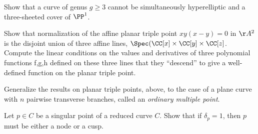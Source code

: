 \begin{exercise}\label{gonality exclusion}
Show that a curve of genus $g \geq 3$ cannot be simultaneously hyperelliptic and a three-sheeted cover of $\PP^1$.
\end{exercise}

\begin{exercise}\label{planar triple pt}
Show that normalization of the affine planar triple point $xy(x-y) = 0$ in $\AA^2$ is the disjoint union of three
affine lines, $\Spec(\CC[x] \times \CC[y]\times \CC[z]$. Compute the linear conditions on the values and derivatives of three polynomial functions f,g,h defined on
these three lines that they ``descend'' to give a well-defined function on the planar triple point.
\end{exercise}

\begin{exercise} Generalize the results on planar triple points, above, to the case of a plane curve with $n$ pairwise
transverse branches, called an \emph{ordinary multiple point}.
\end{exercise}

\begin{exercise}\label{delta=1 characterization}
Let $p \in C$ be a singular point of a reduced curve $C$. Show that if $\delta_p = 1$, then $p$ must be either a node or a cusp.
\end{exercise}



 